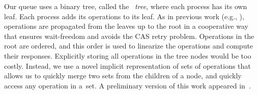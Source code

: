 Our queue uses a binary tree, called the \emph{\ordering\ tree}, where each process has its own leaf.
Each process adds its operations to its leaf.
As in previous work (e.g., \cite{DBLP:conf/stoc/AfekDT95,DBLP:conf/fsttcs/JayantiP05}), operations are propagated from the leaves up to the root in a cooperative way that ensures wait-freedom
and avoids the CAS retry problem.
Operations in the root are ordered, 
and this order is used to linearize the operations and compute their responses.
Explicitly storing all operations in the tree nodes would be too costly.
Instead, we use a novel implicit representation of sets
of operations that allows us to quickly merge two sets from the children of a node,
and quickly access any  operation in a~set.
A preliminary version of this work appeared in~\cite{Nad22}.
